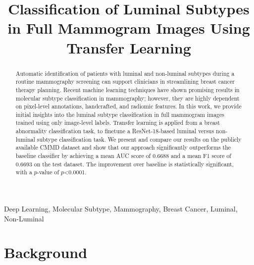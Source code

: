 \documentclass{article}
\title{Classification of Luminal Subtypes in Full Mammogram Images Using Transfer Learning}
\begin{document}
\ninept
\maketitle
\begin{abstract}
Automatic identification of patients with luminal and non-luminal subtypes during a routine mammography screening can support clinicians in streamlining breast cancer therapy planning. Recent machine learning techniques have shown promising results in molecular subtype classification in mammography; however, they are highly dependent on pixel-level annotations, handcrafted, and radiomic features. In this work, we provide initial insights into the luminal subtype classification in full mammogram images trained using only image-level labels. Transfer learning is applied from a breast abnormality classification task, to finetune a ResNet-18-based luminal versus non-luminal subtype classification task. We present and compare our results on the publicly available CMMD dataset and show that our approach significantly outperforms the baseline classifier by achieving a mean AUC score of 0.6688 and a mean F1 score of 0.6693 on the test dataset. The improvement over baseline is statistically significant, with a $p$-value of $p$\textless 0.0001. 

\end{abstract}
\begin{keywords}
Deep Learning, Molecular Subtype, Mammography, Breast Cancer, Luminal, Non-Luminal
\end{keywords}
\section{Background}
\label{sec:intro}
\end{document}
